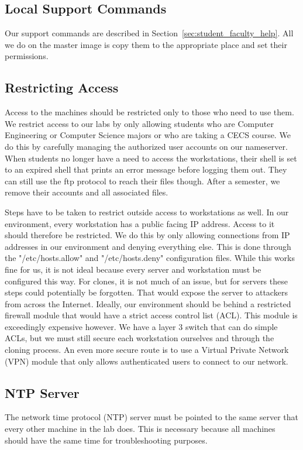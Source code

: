 \subsection{Local Support Commands}
Our support commands are described in Section~\ref{sec:student_faculty_help}.  All we do on the master image is copy them to the appropriate place and set their permissions.

\subsection{Restricting Access}
Access to the machines should be restricted only to those who need to use them.  We restrict access to our labs by only allowing students who are Computer Engineering or Computer Science majors or who are taking a CECS course.  We do this by carefully managing the authorized user accounts on our nameserver.  When students no longer have a need to access the workstations, their shell is set to an expired shell that prints an error message before logging them out.  They can still use the ftp protocol to reach their files though.  After a semester, we remove their accounts and all associated files.  

Steps have to be taken to restrict outside access to workstations as well.  In our environment, every workstation has a public facing IP address.  Access to it should therefore be restricted.  We do this by only allowing connections from IP addresses in our environment and denying everything else.  This is done through the "/etc/hosts.allow" and "/etc/hosts.deny" configuration files.  While this works fine for us, it is not ideal because every server and workstation must be configured this way.  For clones, it is not much of an issue, but for servers these steps could potentially be forgotten.  That would expose the server to attackers from across the Internet.  Ideally, our environment should be behind a restricted firewall module that would have a strict access control list (ACL).  This module is exceedingly expensive however.  We have a layer 3 switch that can do simple ACLs, but we must still secure each workstation ourselves and through the cloning process.  An even more secure route is to use a Virtual Private Network (VPN) module that only allows authenticated users to connect to our network.  

\subsection{NTP Server}
The network time protocol (NTP) server must be pointed to the same server that every other machine in the lab does.  This is necessary because all machines should have the same time for troubleshooting purposes.  

